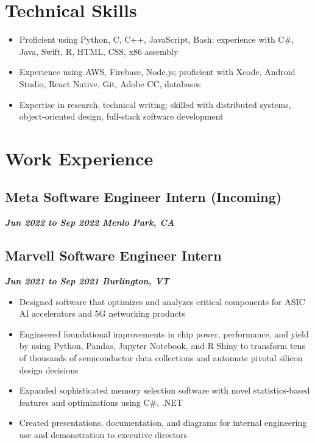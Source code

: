 \documentclass[10pt]{article}
\begin{document}
\begin{raggedright}
    \section*{Technical Skills}

        \begin{itemize}
            \item Proficient using Python, C, C++, JavaScript, Bash; experience with C\#, Java, Swift, R, HTML, CSS, x86 assembly
            \item Experience using AWS, Firebase, Node.js; proficient with Xcode, Android Studio, React Native, Git, Adobe CC, databases
            \item Expertise in research, technical writing; skilled with distributed systems, object-oriented design, full-stack software development
        \end{itemize}

    \section*{Work Experience}
	\subsection*{\textbf{\large{Meta \textendash{} Software Engineer Intern (Incoming)}}} \hfill \textbf{\textit{Jun 2022 to Sep 2022 \textendash{} Menlo Park, CA}}

        \subsection*{\textbf{\large{Marvell \textendash{} Software Engineer Intern}}} \hfill \textbf{\textit{Jun 2021 to Sep 2021 \textendash{} Burlington, VT}}

        \begin{itemize}
            \item Designed software that optimizes and analyzes critical components for ASIC AI accelerators and 5G networking products
            \item Engineered foundational improvements in chip power, performance, and yield by using Python, Pandas, Jupyter Notebook, and R Shiny to transform tens of thousands of semiconductor data collections and automate pivotal silicon design decisions
            \item Expanded sophisticated memory selection software with novel statistics-based features and optimizations using C\#, .NET
            \item Created presentations, documentation, and diagrams for internal engineering use and demonstration to executive directors
        \end{itemize}


\end{raggedright}
\end{document}
